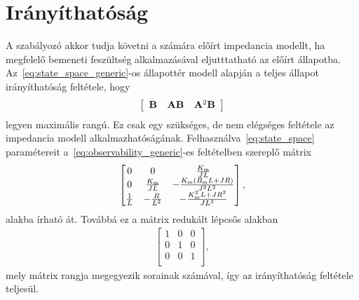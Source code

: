 \chapter{Irányíthatóság}\label{chap:controllability}
A szabályozó akkor tudja követni a számára előírt impedancia modellt, 
ha megfelelő bemeneti feszültség alkalmazásával eljutttatható az előírt állapotba. 
Az~\eqref{eq:state_space_generic}-os állapottér modell alapján a teljes állapot irányíthatóság feltétele, hogy
\begin{align}\label{eq:observability_generic}
    \left[\begin{array}{c|c|c}
        \mathbf{B} & \mathbf{AB} & \mathbf{A}^2 \mathbf{B}
    \end{array}\right]
\end{align}
legyen maximális rangú. Ez csak egy szükséges, de nem elégséges feltétele az impedancia modell alkalmazhatóságának.
Felhasználva~\eqref{eq:state_space} paramétereit a~\eqref{eq:observability_generic}-es feltételben szereplő mátrix
\begin{align}
    \begin{bmatrix}
        0 & 0 & \frac{K_{\mathrm{m}}}{JL} \\
        0 & \frac{K_{\mathrm{m}}}{JL} & -\frac{K_{\mathrm{m}}\left(B_{\mathrm{m}} L + JR\right)}{J^2 L^2} \\
        \frac{1}{L} & -\frac{R}{L^2} & -\frac{K^2_{\mathrm{m}} L + JR^2}{J L^3} \\
    \end{bmatrix},
\end{align}
alakba írható át. Továbbá ez a mátrix redukált lépcsős alakban
\begin{align}
    \begin{bmatrix}
        1 & 0 & 0 \\
        0 & 1 & 0 \\
        0 & 0 & 1 \\
    \end{bmatrix},
\end{align}
mely mátrix rangja megegyezik sorainak számával, így az irányíthatóság feltétele teljesül.